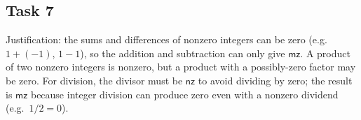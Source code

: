 \documentclass[11pt]{article}
\newcommand{\kw}[1]{\mathsf{#1}}
\newcommand{\nz}{\kw{nz}}
\newcommand{\mz}{\kw{mz}}
\newenvironment{task}[1]{\subsection*{#1}}{}
\begin{document}
\begin{task}{Task 7}
Justification: the sums and differences of nonzero integers can be zero (e.g.\ $1 + (-1)$, $1-1$),
so the addition and subtraction can only give $\mz$. A product of two nonzero integers is nonzero,
but a product with a possibly-zero factor may be zero. For division, the divisor must be
$\nz$ to avoid dividing by zero; the result is $\mz$ because integer division can produce
zero even with a nonzero dividend (e.g.\ $1/2 = 0$).
\end{task}
\end{document}
